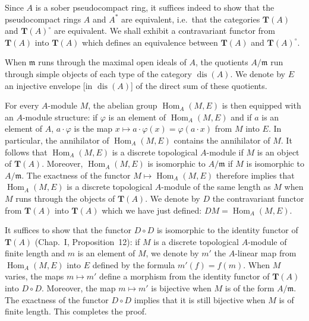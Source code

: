 Since $A$ is a sober pseudocompact ring, it suffices indeed to show
that the pseudocompact rings $A$ and $A^*$ are equivalent, i.e.\ that
the categories $\mathbf{T}(A)$ and $\mathbf{T}(A)^\circ$ are equivalent.
We shall exhibit a contravariant functor from $\mathbf{T}(A)$ into
$\mathbf{T}(A)$ which defines an equivalence between $\mathbf{T}(A)$
and $\mathbf{T}(A)^\circ$.

When $\mathfrak{m}$ runs through the maximal open ideals of $A$, the
quotients $A/\mathfrak{m}$ run through simple objects of each type of
the category $\operatorname{dis}(A)$. We denote by $E$ an injective
envelope [in $\operatorname{dis}(A)$] of the direct sum of these
quotients.

For every $A$-module $M$, the abelian group $\operatorname{Hom}_A(M,E)$
is then equipped with an $A$-module structure: if $\varphi$ is an
element of $\operatorname{Hom}_A(M,E)$ and if $a$ is an element of $A$,
$a\cdot\varphi$ is the map $x\mapsto a\cdot\varphi(x)=\varphi(a\cdot x)$
from $M$ into $E$. In particular, the annihilator of
$\operatorname{Hom}_A(M,E)$ contains the annihilator of $M$. It follows
that $\operatorname{Hom}_A(M,E)$ is a discrete topological $A$-module
if $M$ is an object of $\mathbf{T}(A)$. Moreover,
$\operatorname{Hom}_A(M,E)$ is isomorphic to $A/\mathfrak{m}$ if $M$ is
isomorphic to $A/\mathfrak{m}$. The exactness of the functor
$M\mapsto\operatorname{Hom}_A(M,E)$ therefore implies that
$\operatorname{Hom}_A(M,E)$ is a discrete topological $A$-module of the
same length as $M$ when $M$ runs through the objects of
$\mathbf{T}(A)$. We denote by $D$ the contravariant functor from
$\mathbf{T}(A)$ into $\mathbf{T}(A)$ which we have just defined:
$DM=\operatorname{Hom}_A(M,E)$.

It suffices to show that the functor $D\circ D$ is isomorphic to the
identity functor of $\mathbf{T}(A)$ (Chap.~I, Proposition~12): if $M$
is a discrete topological $A$-module of finite length and $m$ is an
element of $M$, we denote by $m'$ the $A$-linear map from
$\operatorname{Hom}_A(M,E)$ into $E$ defined by the formula
$m'(f)=f(m)$. When $M$ varies, the maps $m\mapsto m'$ define a morphism
from the identity functor of $\mathbf{T}(A)$ into $D\circ D$. Moreover,
the map $m\mapsto m'$ is bijective when $M$ is of the form
$A/\mathfrak{m}$. The exactness of the functor $D\circ D$ implies that
it is still bijective when $M$ is of finite length. This completes the
proof.
